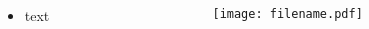\begin{columns}[t]
    \begin{column}{0.5\textwidth}
        \begin{itemize}
            \item text
        \end{itemize}
    \end{column}
    \begin{column}{0.5\textwidth}
        \begin{figure}
            \centering
            \texttt{[image: filename.pdf]}
        \end{figure}
    \end{column}
\end{columns}
